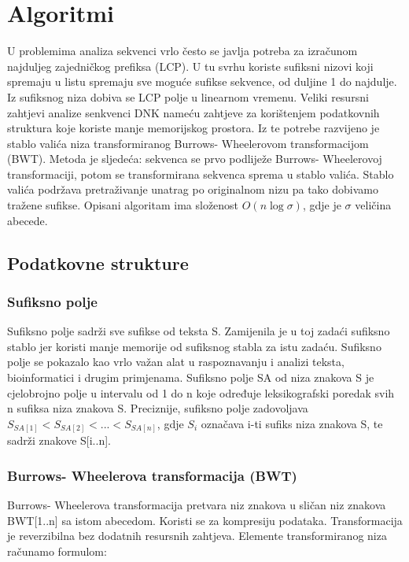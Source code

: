 \documentclass[11pt]{article}
\begin{document}
\section{Algoritmi}
U problemima analiza sekvenci vrlo često se javlja potreba za izračunom najduljeg zajedničkog prefiksa (LCP). U tu svrhu koriste sufiksni nizovi koji spremaju u listu spremaju sve moguće sufikse sekvence, od duljine 1 do najdulje. Iz sufiksnog niza dobiva se LCP polje u linearnom vremenu. 
Veliki resursni zahtjevi analize senkvenci DNK nameću zahtjeve za korištenjem podatkovnih struktura koje koriste manje memorijskog prostora. Iz te potrebe razvijeno je stablo valića niza transformiranog Burrows- Wheelerovom transformacijom (BWT).
Metoda je sljedeća: sekvenca se prvo podliježe Burrows- Wheelerovoj transformaciji, potom se transformirana sekvenca sprema u stablo valića. Stablo valića podržava pretraživanje unatrag po originalnom nizu pa tako dobivamo tražene sufikse. Opisani algoritam ima složenost $O(n\log\sigma)$, gdje je $\sigma$ veličina abecede.

\subsection{Podatkovne strukture}

\subsubsection{Sufiksno polje}
Sufiksno polje sadrži sve sufikse od teksta S. Zamijenila je u toj zadaći sufiksno stablo jer koristi manje memorije od sufiksnog stabla za istu zadaću. Sufiksno polje se pokazalo kao vrlo važan alat u raspoznavanju i analizi teksta, bioinformatici i drugim primjenama. 
Sufiksno polje SA od niza znakova S je cjelobrojno polje u intervalu od 1 do n koje određuje leksikografski poredak svih n sufiksa niza znakova S. Preciznije, sufiksno polje zadovoljava $ S_{SA[1]} < S_{SA[2]} < ... < S_{SA[n]}$, gdje $ S_i $ označava i-ti sufiks niza znakova S, te sadrži znakove S[i..n].
 
\subsubsection{Burrows- Wheelerova transformacija (BWT)}
\label{BWT_definicija}
Burrows- Wheelerova transformacija pretvara niz znakova u sličan niz znakova BWT[1..n] sa istom abecedom. Koristi se za kompresiju podataka. Transformacija je reverzibilna bez dodatnih resursnih zahtjeva. Elemente transformiranog niza računamo formulom:
\end{document}
